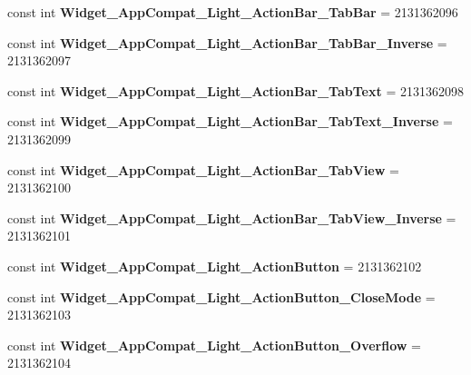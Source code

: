 \begin{DoxyCompactItemize}
const int {\bfseries Widget\+\_\+\+App\+Compat\+\_\+\+Light\+\_\+\+Action\+Bar\+\_\+\+Tab\+Bar} = 2131362096
\item 
\mbox{\label{classXaria_1_1Resource_1_1Style_abf67dad8eff503ca633f7fb9142e3d86}} 
const int {\bfseries Widget\+\_\+\+App\+Compat\+\_\+\+Light\+\_\+\+Action\+Bar\+\_\+\+Tab\+Bar\+\_\+\+Inverse} = 2131362097
\item 
\mbox{\label{classXaria_1_1Resource_1_1Style_a6186b4ab4b2222a8c184449bea1a5a54}} 
const int {\bfseries Widget\+\_\+\+App\+Compat\+\_\+\+Light\+\_\+\+Action\+Bar\+\_\+\+Tab\+Text} = 2131362098
\item 
\mbox{\label{classXaria_1_1Resource_1_1Style_aa2710823b654090d80bd4e5481278e3a}} 
const int {\bfseries Widget\+\_\+\+App\+Compat\+\_\+\+Light\+\_\+\+Action\+Bar\+\_\+\+Tab\+Text\+\_\+\+Inverse} = 2131362099
\item 
\mbox{\label{classXaria_1_1Resource_1_1Style_ae6ba1d1e1f79430e303d656dd3727182}} 
const int {\bfseries Widget\+\_\+\+App\+Compat\+\_\+\+Light\+\_\+\+Action\+Bar\+\_\+\+Tab\+View} = 2131362100
\item 
\mbox{\label{classXaria_1_1Resource_1_1Style_a28c8ca19d99d6aaa761b574f441c3536}} 
const int {\bfseries Widget\+\_\+\+App\+Compat\+\_\+\+Light\+\_\+\+Action\+Bar\+\_\+\+Tab\+View\+\_\+\+Inverse} = 2131362101
\item 
\mbox{\label{classXaria_1_1Resource_1_1Style_a5c81e6cc82279f5510528fc43e77bb49}} 
const int {\bfseries Widget\+\_\+\+App\+Compat\+\_\+\+Light\+\_\+\+Action\+Button} = 2131362102
\item 
\mbox{\label{classXaria_1_1Resource_1_1Style_af2b1ac07146ba8b337d752f3490f994e}} 
const int {\bfseries Widget\+\_\+\+App\+Compat\+\_\+\+Light\+\_\+\+Action\+Button\+\_\+\+Close\+Mode} = 2131362103
\item 
\mbox{\label{classXaria_1_1Resource_1_1Style_a669324118c633f609f713c150cd42a0b}} 
const int {\bfseries Widget\+\_\+\+App\+Compat\+\_\+\+Light\+\_\+\+Action\+Button\+\_\+\+Overflow} = 2131362104

\end{DoxyCompactItemize}
